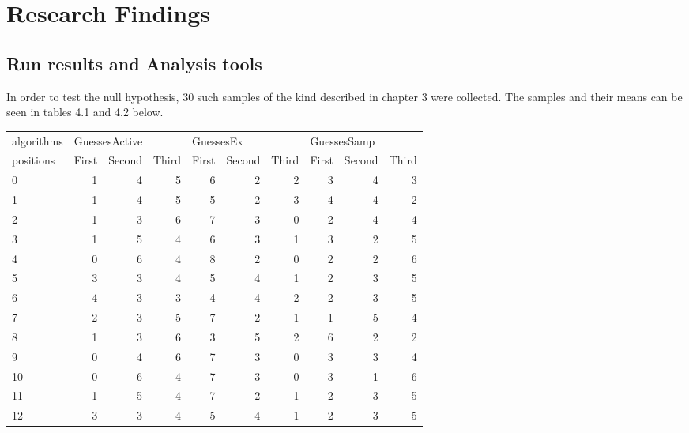 \chapter{Research Findings}
\label{Chapter4}
\section{Run results and Analysis tools}
In order to test the null hypothesis, 30 such samples of the kind described
in chapter 3 were collected. The samples and their means can be seen in tables
4.1 and 4.2 below.

\begin{table}
\begin{tabular}{lrrrrrrrrr}
\toprule
algorithms & \multicolumn{3}{l}{GuessesActive} & \multicolumn{3}{l}{GuessesEx} & \multicolumn{3}{l}{GuessesSamp} \\
positions &             First &  Second &  Third &         First &  Second  &  Third &           First &  Second &  Third \\
\midrule
0  &             1 &  4 &  5 &         6 &  2 &  2 &           3 &  4 &  3 \\
1  &             1 &  4 &  5 &         5 &  2 &  3 &           4 &  4 &  2 \\
2  &             1 &  3 &  6 &         7 &  3 &  0 &           2 &  4 &  4 \\
3  &             1 &  5 &  4 &         6 &  3 &  1 &           3 &  2 &  5 \\
4  &             0 &  6 &  4 &         8 &  2 &  0 &           2 &  2 &  6 \\
5  &             3 &  3 &  4 &         5 &  4 &  1 &           2 &  3 &  5 \\
6  &             4 &  3 &  3 &         4 &  4 &  2 &           2 &  3 &  5 \\
7  &             2 &  3 &  5 &         7 &  2 &  1 &           1 &  5 &  4 \\
8  &             1 &  3 &  6 &         3 &  5 &  2 &           6 &  2 &  2 \\
9  &             0 &  4 &  6 &         7 &  3 &  0 &           3 &  3 &  4 \\
10 &             0 &  6 &  4 &         7 &  3 &  0 &           3 &  1 &  6 \\
11 &             1 &  5 &  4 &         7 &  2 &  1 &           2 &  3 &  5 \\
12 &             3 &  3 &  4 &         5 &  4 &  1 &           2 &  3 &  5 \\

\end{tabular}
\end{table}
